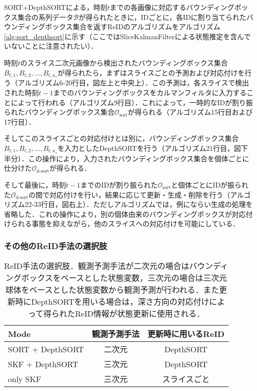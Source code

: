         SORT+DepthSORTによる，時刻$t$までの各画像に対応するバウンディングボックス集合の系列データ$\mathcal{B}$が得られたときに，IDごとに，各IDに割り当てられたバウンディングボックス集合を返すReIDのアルゴリズムをアルゴリズム\ref{alg:sort_depthsort}に示す（ここではSliceKalmanFilterによる状態推定を含んでいないことに注意されたい）．

        時刻$t$のスライス二次元画像から検出されたバウンディングボックス集合$B_{t, 1}, B_{t, 2}, \dots, B_{t, n_s}$が得られたら，まずはスライスごとの予測および対応付けを行う（アルゴリズム6-20行目，図左上と中央上）．この予測は，各スライスで検出された時刻$t-1$までのバウンディングボックスをカルマンフィルタに入力することによって行われる（アルゴリズム9行目）．これによって，一時的なIDが割り振られたバウンディングボックス集合$\mathcal{O}_{\text{sort}}$が得られる（アルゴリズム15行目および17行目）．

        そしてこのスライスごとの対応付けとは別に，バウンディングボックス集合$B_{t, 1}, B_{t, 2}, \dots, B_{t, n_s}$を入力としたDepthSORTを行う（アルゴリズム21行目，図下半分）．この操作により，入力されたバウンディングボックス集合を個体ごとに仕分けた$\mathcal{O}_{\text{d-sort}}$が得られる．

        そして最後に，時刻$t-1$までのIDが割り振られた$\mathcal{O}_{\text{sort}}$と個体ごとにIDが振られた$\mathcal{O}_{\text{d-sort}}$の間で対応付けを行い，結果に応じて更新・生成・削除を行う（アルゴリズム22-33行目，図右上）．ただしアルゴリズムでは，例にならい生成の処理を省略した．これの操作により，別の個体由来のバウンディングボックスが対応付けられる事態を抑えながら，他のスライスへの対応付けを可能にしている．

        \subsubsection{その他のReID手法の選択肢}

        \begin{table}[t]
            \centering
            \caption[ReID手法の選択肢]{ReID手法の選択肢．観測予測手法が二次元の場合はバウンディングボックスをベースとした状態変数，三次元の場合は三次元球体をベースとした状態変数から観測予測が行われる．また更新時にDepthSORTを用いる場合は，深さ方向の対応付けによって得られたReID情報が状態更新に使用される．}
            \label{tab:reidentification_methods}
            \begin{tabular}{l|cc}
                Mode &  観測予測手法 & 更新時に用いるReID
                \\ \hline \hline
                SORT + DepthSORT & 二次元 & DepthSORT
                \\ SKF + DepthSORT & 三次元 & DepthSORT
                \\ only SKF & 三次元 & スライスごと 
            \end{tabular}
        \end{table}

